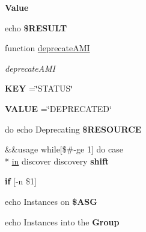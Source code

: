 \begin{DoxyCompactItemize}
\item 
{\bfseries Value}
\item 
\hypertarget{aws-toolkit_8bash_ab9159d83e9c057543da15dc3c709211e}{echo {\bfseries \$\-R\-E\-S\-U\-L\-T}}\label{aws-toolkit_8bash_ab9159d83e9c057543da15dc3c709211e}

\item 
function \hyperlink{aws-toolkit_8bash_a32f418bd0c6ccd71870cdf3b33666034}{deprecate\-A\-M\-I}
\begin{DoxyCompactList}\small\item\em deprecate\-A\-M\-I \end{DoxyCompactList}\item 
\hypertarget{aws-toolkit_8bash_a6ae70ce7b1b294c469f11cbabb8f30d6}{{\bfseries K\-E\-Y} =\char`\"{}S\-T\-A\-T\-U\-S\char`\"{}}\label{aws-toolkit_8bash_a6ae70ce7b1b294c469f11cbabb8f30d6}

\item 
\hypertarget{aws-toolkit_8bash_a8ecb953637f66f7ca9d3fb74949978c8}{{\bfseries V\-A\-L\-U\-E} =\char`\"{}D\-E\-P\-R\-E\-C\-A\-T\-E\-D\char`\"{}}\label{aws-toolkit_8bash_a8ecb953637f66f7ca9d3fb74949978c8}

\item 
\hypertarget{aws-toolkit_8bash_a39474c6d91e39cdc82d837efa59f730f}{do echo Deprecating {\bfseries \$\-R\-E\-S\-O\-U\-R\-C\-E}}\label{aws-toolkit_8bash_a39474c6d91e39cdc82d837efa59f730f}

\item 
\hypertarget{aws-toolkit_8bash_a054647f6e9b7dbae3988622fd0a228be}{\&\&usage while\mbox{[}\$\#-\/ge 1\mbox{]} do case \\*
\hyperlink{aws-toolkit_8bash_ad20b974a24d3991d708fae120975fb17}{in} discover discovery {\bfseries shift}}\label{aws-toolkit_8bash_a054647f6e9b7dbae3988622fd0a228be}

\item 
\hypertarget{aws-toolkit_8bash_a3ca040febe6c7566796666bd9465f801}{{\bfseries if} \mbox{[}-\/n \$1\mbox{]}}\label{aws-toolkit_8bash_a3ca040febe6c7566796666bd9465f801}

\item 
\hypertarget{aws-toolkit_8bash_a61d665dbd096a236e6c19a02252d4b90}{echo Instances on {\bfseries \$\-A\-S\-G}}\label{aws-toolkit_8bash_a61d665dbd096a236e6c19a02252d4b90}

\item 
\hypertarget{aws-toolkit_8bash_a8959e62014d5702b104c54f768c6f9c0}{echo Instances into the {\bfseries Group}}\label{aws-toolkit_8bash_a8959e62014d5702b104c54f768c6f9c0}


\end{DoxyCompactItemize}
